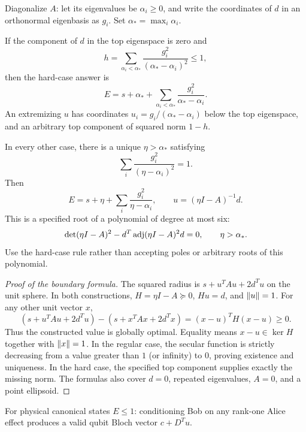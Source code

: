Diagonalize $A$: let its eigenvalues be $\alpha_i\ge0$, and write the coordinates of $d$ in an orthonormal eigenbasis as $g_i$. Set $\alpha_* = \max_i\alpha_i$.

If the component of $d$ in the top eigenspace is zero and
\begin{equation}
 h=\sum_{\alpha_i<\alpha_*}\frac{g_i^2}{(\alpha_*-\alpha_i)^2}\le1,
 \label{eq:hardcondition}
\end{equation}
then the hard-case answer is
\begin{equation}
 \boxed{E=s+\alpha_*+
 \sum_{\alpha_i<\alpha_*}\frac{g_i^2}{\alpha_*-\alpha_i}.}
 \label{eq:hardvalue}
\end{equation}
An extremizing $u$ has coordinates $u_i=g_i/(\alpha_*-\alpha_i)$ below the top eigenspace, and an arbitrary top component of squared norm $1-h$.

In every other case, there is a unique $\eta>\alpha_*$ satisfying
\begin{equation}
 \sum_i\frac{g_i^2}{(\eta-\alpha_i)^2}=1.
 \label{eq:secular}
\end{equation}
Then
\begin{equation}
 \boxed{E=s+\eta+\sum_i\frac{g_i^2}{\eta-\alpha_i},\qquad
 u=(\eta I-A)^{-1}d.}
 \label{eq:regularvalue}
\end{equation}
This is a specified root of a polynomial of degree at most six:
\begin{equation}
 \det(\eta I-A)^2-d^T\operatorname{adj}(\eta I-A)^2d=0,
 \qquad \eta>\alpha_*.
 \label{eq:sextic}
\end{equation}
Use the hard-case rule rather than accepting poles or arbitrary roots of this polynomial.

\begin{proof}[Proof of the boundary formula]
The squared radius is $s+u^TAu+2d^Tu$ on the unit sphere. In both constructions, $H=\eta I-A\succeq0$, $Hu=d$, and $\left\lVert u\right\rVert=1$. For any other unit vector $x$,
\begin{equation}
 (s+u^TAu+2d^Tu)-(s+x^TAx+2d^Tx)
 =(x-u)^TH(x-u)\ge0.
\end{equation}
Thus the constructed value is globally optimal. Equality means $x-u\in\ker H$ together with $\left\lVert x\right\rVert=1$. In the regular case, the secular function is strictly decreasing from a value greater than $1$ (or infinity) to $0$, proving existence and uniqueness. In the hard case, the specified top component supplies exactly the missing norm. The formulas also cover $d=0$, repeated eigenvalues, $A=0$, and a point ellipsoid.
\end{proof}

For physical canonical states $E\le1$: conditioning Bob on any rank-one Alice effect produces a valid qubit Bloch vector $c+D^Tu$.
